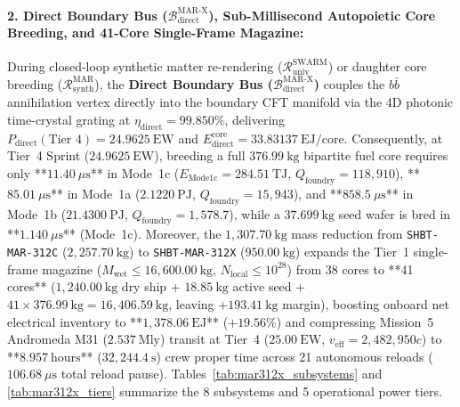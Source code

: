 \documentclass[11pt,onecolumn]{article}
\begin{document}
\paragraph{2. Direct Boundary Bus ($\mathcal{B}_{\text{direct}}^{\text{MAR-X}}$), Sub-Millisecond Autopoietic Core Breeding, and 41-Core Single-Frame Magazine:}
During closed-loop synthetic matter re-rendering ($\mathcal{R}_{\text{univ}}^{\text{SWARM}}$) or daughter core breeding ($\mathcal{R}_{\text{synth}}^{\text{MAR}}$), the \textbf{Direct Boundary Bus ($\mathcal{B}_{\text{direct}}^{\text{MAR-X}}$)} couples the $b\bar{b}$ annihilation vertex directly into the boundary CFT manifold via the 4D photonic time-crystal grating at $\eta_{\text{direct}} = 99.850\%$, delivering $P_{\text{direct}}(\text{Tier 4}) = 24.9625~\text{EW}$ and $E_{\text{direct}}^{\text{core}} = 33.83137~\text{EJ/core}$. Consequently, at Tier~4 Sprint ($24.9625~\text{EW}$), breeding a full $376.99~\text{kg}$ bipartite fuel core requires only **$11.40~\mu\text{s}$** in Mode~1c ($E_{\text{Mode1c}} = 284.51~\text{TJ}$, $Q_{\text{foundry}} = 118{,}910$), **$85.01~\mu\text{s}$** in Mode~1a ($2.1220~\text{PJ}$, $Q_{\text{foundry}} = 15{,}943$), and **$858.5~\mu\text{s}$** in Mode~1b ($21.4300~\text{PJ}$, $Q_{\text{foundry}} = 1{,}578.7$), while a $37.699~\text{kg}$ seed wafer is bred in **$1.140~\mu\text{s}$** (Mode~1c). Moreover, the $1{,}307.70~\mathrm{kg}$ mass reduction from \texttt{SHBT-MAR-312C} ($2{,}257.70~\mathrm{kg}$) to \texttt{SHBT-MAR-312X} ($950.00~\mathrm{kg}$) expands the Tier~1 single-frame magazine ($M_{\text{wet}} \le 16{,}600.00~\mathrm{kg}$, $N_{\text{local}} \le 10^{28}$) from 38 cores to **41 cores** ($1{,}240.00~\mathrm{kg}$ dry ship + $18.85~\mathrm{kg}$ active seed + $41 \times 376.99~\mathrm{kg} = 16{,}406.59~\mathrm{kg}$, leaving $+193.41~\mathrm{kg}$ margin), boosting onboard net electrical inventory to **$1{,}378.06~\mathrm{EJ}$** ($+19.56\%$) and compressing Mission~5 Andromeda M31 ($2.537~\text{Mly}$) transit at Tier~4 ($25.00~\text{EW}$, $v_{\text{eff}} = 2{,}482{,}950c$) to **$8.957~\text{hours}$** ($32{,}244.4~\text{s}$) crew proper time across 21 autonomous reloads ($106.68~\mu\text{s}$ total reload pause). Tables~\ref{tab:mar312x_subsystems} and \ref{tab:mar312x_tiers} summarize the 8 subsystems and 5 operational power tiers.
\end{document}
